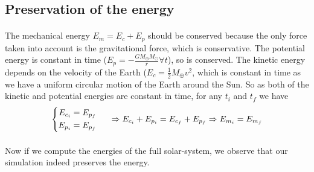 \documentclass[a4paper, twoside, 11pt]{report}
\theoremstyle{theorem}
\theoremstyle{remark}
\theoremstyle{exemple}
\begin{document}
        	\subsection{Preservation of the energy}
	
            \paragraph{}The mechanical energy $E_m = E_c + E_p$ should be conserved because the only force taken into account is the gravitational force, which is conservative. The potential energy is constant in time ($E_p = -\frac{GM_{\oplus}M_{\odot}}{r} \forall t$), so is conserved. The kinetic energy depends on the velocity of the Earth ($E_c = \frac{1}{2}M_{\oplus}v^2$, which is constant in time as we have a uniform circular motion of the Earth around the Sun. So as both of the kinetic and potential energies are constant in time, for any $t_i$ and $t_f$ we have
                \begin{equation*}
                    \left\{
                        \begin{aligned}
                            E_{c_i} &= E_{p_f}\\
                            E_{p_i} &= E_{p_f}
                        \end{aligned}
                    \right. \hspace{0.5cm} \Rightarrow E_{c_i} + E_{p_i} = E_{c_f} + E_{p_f} \Rightarrow E_{m_i} = E_{m_f}
                \end{equation*} 
       
                
            \paragraph{}Now if we compute the energies of the full solar-system, we observe that our simulation indeed preserves the energy.
            
\end{document}
